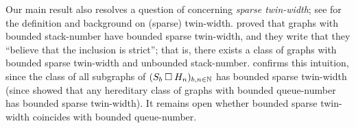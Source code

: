 \documentclass[kpfonts]{patmorin}
\newcommand{\CartProd}{\mathbin{\square}}
\begin{document}

Our main result also resolves a question of \citet{BGKTWb} concerning \emph{sparse twin-width}; see \citep{BKTW,BGKTWa,BGKTWb} for the definition and background on (sparse) twin-width. \citet{BGKTWb} proved that graphs with bounded stack-number have bounded sparse twin-width, and they write that they ``believe that the inclusion is strict''; that is, there exists a class of graphs with bounded sparse twin-width and unbounded stack-number.  confirms this intuition, since the class of all subgraphs of $(S_b \CartProd H_n)_{b,n\in\N}$ has bounded sparse twin-width (since \citet{BGKTWb} showed that any hereditary class of graphs with bounded queue-number has bounded sparse twin-width). 
It remains open whether bounded sparse twin-width coincides with bounded queue-number.
\end{document}
